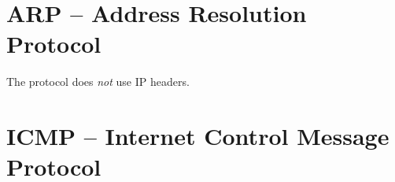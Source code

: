 % 
% 

\section{ARP -- Address Resolution Protocol}
\begin{remark}
The  protocol does \textit{not} use IP headers.
\end{remark}

\section{ICMP -- Internet Control Message Protocol}


